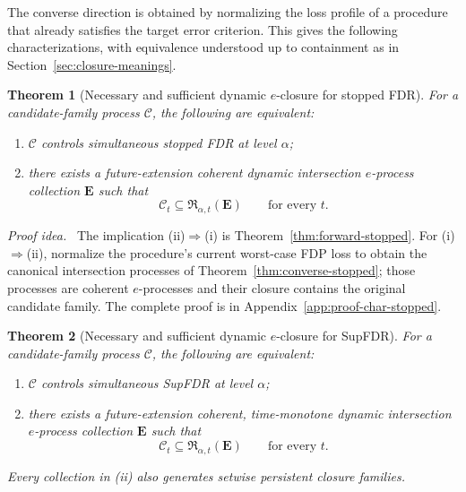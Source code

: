 \documentclass[11pt]{article}
\numberwithin{equation}{section}
\theoremstyle{plain}
\newtheorem{theorem}{Theorem}[section]
\theoremstyle{definition}
\newcommand{\C}{\mathcal C}
\newcommand{\Rfam}{\mathfrak R}
\newcommand{\proofidea}{\par\medskip\noindent\textit{Proof idea.}\ }
\begin{document}
The converse direction is obtained by normalizing the loss profile of a procedure that already satisfies the target error criterion. This gives the following characterizations, with equivalence understood up to containment as in Section~\ref{sec:closure-meanings}.

\begin{theorem}[Necessary and sufficient dynamic $e$-closure for stopped FDR]\label{thm:characterization-stopped}
For a candidate-family process $\C$, the following are equivalent:
\begin{enumerate}
\item[(i)] $\C$ controls simultaneous stopped FDR at level $\alpha$;
\item[(ii)] there exists a future-extension coherent dynamic intersection $e$-process collection $\mathbf E$ such that
\begin{equation}\label{eq:characterization-stopped}
  \C_t\subseteq\Rfam_{\alpha,t}(\mathbf E)
  \qquad\text{for every }t.
\end{equation}
\end{enumerate}
\end{theorem}

\proofidea
The implication (ii)$\Rightarrow$(i) is Theorem~\ref{thm:forward-stopped}. For (i)$\Rightarrow$(ii), normalize the procedure's current worst-case FDP loss to obtain the canonical intersection processes of Theorem~\ref{thm:converse-stopped}; those processes are coherent $e$-processes and their closure contains the original candidate family. The complete proof is in Appendix~\ref{app:proof-char-stopped}.

\begin{theorem}[Necessary and sufficient dynamic $e$-closure for SupFDR]\label{thm:characterization-sup}
For a candidate-family process $\C$, the following are equivalent:
\begin{enumerate}
\item[(i)] $\C$ controls simultaneous SupFDR at level $\alpha$;
\item[(ii)] there exists a future-extension coherent, time-monotone dynamic intersection $e$-process collection $\mathbf E$ such that
\begin{equation}\label{eq:characterization-sup}
  \C_t\subseteq\Rfam_{\alpha,t}(\mathbf E)
  \qquad\text{for every }t.
\end{equation}
\end{enumerate}
Every collection in (ii) also generates setwise persistent closure families.
\end{theorem}
\end{document}

